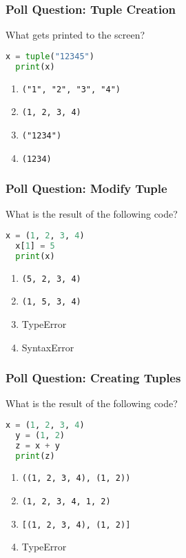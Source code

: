\documentclass[xcolor=table]{beamer}
\begin{document}
%
%
\begin{frame}[fragile]
  \frametitle{Poll Question: Tuple Creation}
  What gets printed to the screen?
  \begin{lstlisting}[language=Python, autogobble]
  x = tuple("12345")
  print(x)
  \end{lstlisting}
  \vfill
  \begin{enumerate}[A] 
    \item \lstinline|("1", "2", "3", "4")|
    \item \lstinline|(1, 2, 3, 4)|
    \item \lstinline|("1234")|
    \item \lstinline|(1234)|
  \end{enumerate}
\end{frame}


%
%
\begin{frame}[fragile]
  \frametitle{Poll Question: Modify Tuple}
  What is the result of the following code?
  \begin{lstlisting}[language=Python, autogobble]
  x = (1, 2, 3, 4)
  x[1] = 5
  print(x)
  \end{lstlisting}
  \vfill
  \begin{enumerate}[A] 
    \item \lstinline|(5, 2, 3, 4)|
    \item \lstinline|(1, 5, 3, 4)|
    \item TypeError
    \item SyntaxError
  \end{enumerate}
\end{frame}

%
%
\begin{frame}[fragile]
  \frametitle{Poll Question: Creating Tuples} 
  What is the result of the following code?
  \begin{lstlisting}[language=Python, autogobble]
  x = (1, 2, 3, 4)
  y = (1, 2)
  z = x + y
  print(z)
  \end{lstlisting}
  \vfill
  \begin{enumerate}[A] 
    \item \lstinline|((1, 2, 3, 4), (1, 2))|
    \item \lstinline|(1, 2, 3, 4, 1, 2)|
    \item \lstinline|[(1, 2, 3, 4), (1, 2)]|
    \item TypeError
  \end{enumerate}
\end{frame}
\end{document}
